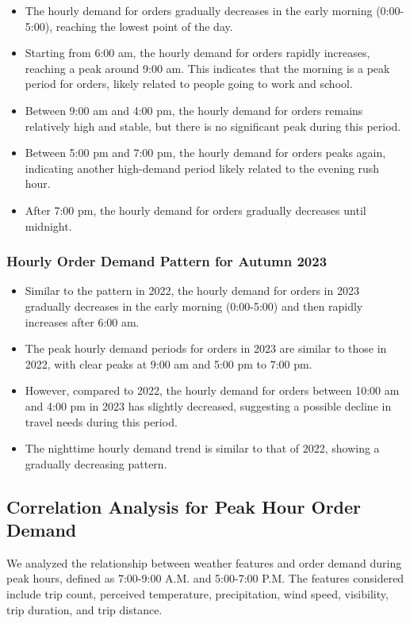 \documentclass[11pt]{article}
\begin{document}
\begin{itemize}
    \item The hourly demand for orders gradually decreases in the early morning (0:00-5:00), reaching the lowest point of the day.
    \item Starting from 6:00 am, the hourly demand for orders rapidly increases, reaching a peak around 9:00 am. This indicates that the morning is a peak period for orders, likely related to people going to work and school.
    \item Between 9:00 am and 4:00 pm, the hourly demand for orders remains relatively high and stable, but there is no significant peak during this period.
    \item Between 5:00 pm and 7:00 pm, the hourly demand for orders peaks again, indicating another high-demand period likely related to the evening rush hour.
    \item After 7:00 pm, the hourly demand for orders gradually decreases until midnight.
\end{itemize}

\subsubsection{Hourly Order Demand Pattern for Autumn 2023}

\begin{itemize}
    \item Similar to the pattern in 2022, the hourly demand for orders in 2023 gradually decreases in the early morning (0:00-5:00) and then rapidly increases after 6:00 am.
    \item The peak hourly demand periods for orders in 2023 are similar to those in 2022, with clear peaks at 9:00 am and 5:00 pm to 7:00 pm.
    \item However, compared to 2022, the hourly demand for orders between 10:00 am and 4:00 pm in 2023 has slightly decreased, suggesting a possible decline in travel needs during this period.
    \item The nighttime hourly demand trend is similar to that of 2022, showing a gradually decreasing pattern.
\end{itemize}

\subsection{Correlation Analysis for Peak Hour Order Demand}

We analyzed the relationship between weather features and order demand during peak hours, defined as 7:00-9:00 A.M. and 5:00-7:00 P.M. The features considered include trip count, perceived temperature, precipitation, wind speed, visibility, trip duration, and trip distance.
\end{document}
